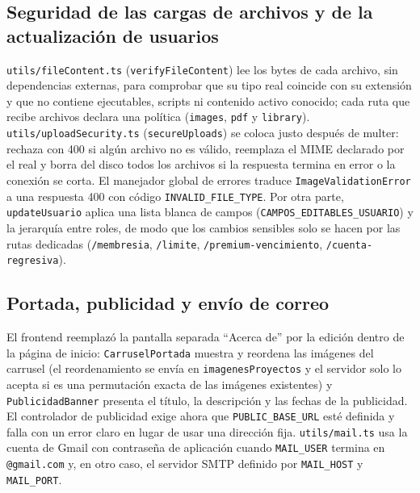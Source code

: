 \subsection{Seguridad de las cargas de archivos y de la actualización de usuarios}
\texttt{utils/fileContent.ts} (\texttt{verifyFileContent}) lee los bytes de cada archivo, sin dependencias externas, para comprobar que su tipo real coincide con su extensión y que no contiene ejecutables, scripts ni contenido activo conocido; cada ruta que recibe archivos declara una política (\texttt{images}, \texttt{pdf} y \texttt{library}). \texttt{utils/uploadSecurity.ts} (\texttt{secureUploads}) se coloca justo después de multer: rechaza con 400 si algún archivo no es válido, reemplaza el MIME declarado por el real y borra del disco todos los archivos si la respuesta termina en error o la conexión se corta. El manejador global de errores traduce \texttt{ImageValidationError} a una respuesta 400 con código \texttt{INVALID\_FILE\_TYPE}. Por otra parte, \texttt{updateUsuario} aplica una lista blanca de campos (\texttt{CAMPOS\_EDITABLES\_USUARIO}) y la jerarquía entre roles, de modo que los cambios sensibles solo se hacen por las rutas dedicadas (\texttt{/membresia}, \texttt{/limite}, \texttt{/premium-vencimiento}, \texttt{/cuenta-regresiva}).

\subsection{Portada, publicidad y envío de correo}
El frontend reemplazó la pantalla separada ``Acerca de'' por la edición dentro de la página de inicio: \texttt{CarruselPortada} muestra y reordena las imágenes del carrusel (el reordenamiento se envía en \texttt{imagenesProyectos} y el servidor solo lo acepta si es una permutación exacta de las imágenes existentes) y \texttt{PublicidadBanner} presenta el título, la descripción y las fechas de la publicidad. El controlador de publicidad exige ahora que \texttt{PUBLIC\_BASE\_URL} esté definida y falla con un error claro en lugar de usar una dirección fija. \texttt{utils/mail.ts} usa la cuenta de Gmail con contraseña de aplicación cuando \texttt{MAIL\_USER} termina en \texttt{@gmail.com} y, en otro caso, el servidor SMTP definido por \texttt{MAIL\_HOST} y \texttt{MAIL\_PORT}.
